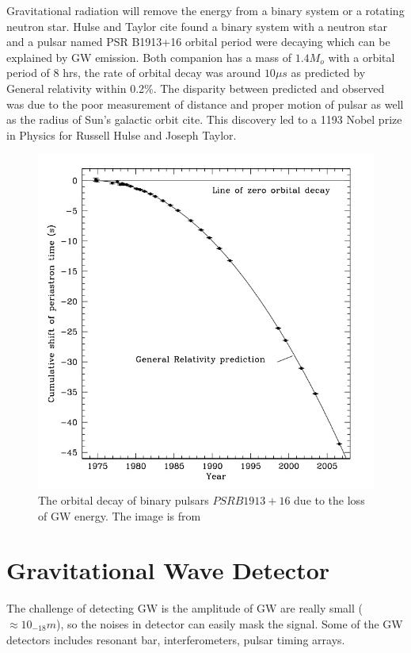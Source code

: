 \documentclass{ttuthes2007}
\begin{document}
Gravitational radiation will remove the energy from a binary system or a
rotating neutron star. Hulse and Taylor cite found a binary system with a
neutron star and a pulsar named PSR B1913+16 orbital period were decaying which
can be explained by \acl{GW} emission. Both companion has a mass of $1.4 M_o$
with a orbital period of 8 hrs, the rate of orbital decay was around $10 \mu s$
as predicted by General relativity within 0.2\%. The disparity between predicted
and observed was due to the poor measurement of distance and proper motion of
pulsar as well as the radius of Sun's galactic orbit cite. This discovery led to
a 1193 Nobel prize in Physics for Russell Hulse and Joseph Taylor.
\begin{figure}[bht!]
	\includegraphics[width=\textwidth]{figure/pulsar.png}
	\caption{The orbital decay of binary pulsars $ PSR B1913+16$ due to the
loss of \ac{GW} energy. The image is from \cite{Weisberg_2010}}
\end{figure}  

\section{Gravitational Wave Detector}
The challenge of detecting \ac{GW} is the amplitude of \ac{GW} are really small
 ($\approx10_{-18}m$), so the noises in detector can easily mask the signal.
Some of the \ac{GW} detectors includes resonant bar, interferometers, pulsar
timing arrays. 
\end{document}
